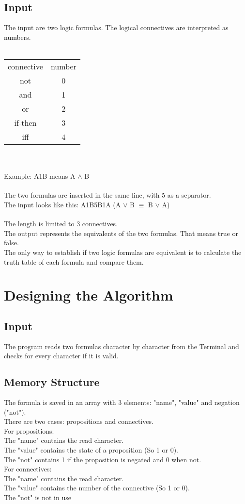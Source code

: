 \documentclass[11pt, a4paper, titlepage, block]{article}
\begin{document}
	\subsection{Input}
	The input are two logic formulas. The logical connectives are interpreted as numbers. \\
	\\
	\begin{tabular}{cc}
	connective & number\\
		not & 0\\
		and & 1\\
		or & 2\\
		if-then & 3\\
		iff & 4\\
	\end{tabular}\\
	\\
	Example: A1B means A $\wedge $ B\\
	\\ 
	The two formulas are inserted in the same line, with 5 as a separator.\\
	The input looks like this: A1B5B1A (A $\vee $ B $\equiv $ B $\vee $ A)\\\\
	The length is limited to 3 connectives.\\
	The output represents the equivalents of the two formulas. That means true or false.\\
	The only way to establish if two logic formulas are equivalent is to calculate the truth table of each formula and compare them.
	
	\newpage			
\section{Designing the Algorithm}
	\subsection{Input}
	The program reads two formulas character by character from the Terminal and checks for every character if it is valid.
	
	\subsection{Memory Structure}
		The formula is saved in an array with 3 elements: "name", "value" and negation ("not").\\
		There are two cases: propositions and connectives.\\
		For propositions:\\
		The "name" contains the read character. \\
		The "value" contains the state of a proposition (So 1 or 0).\\
		The "not" contains 1 if the proposition is negated and 0 when not.\\
		For connectives:\\
		The "name" contains the read character. \\
		The "value" contains the number of the connective  (So 1 or 0).\\
		The "not" is not in use
\end{document}
